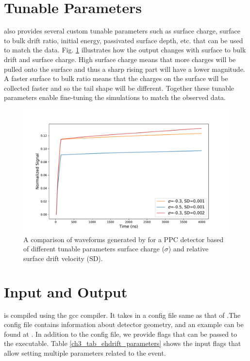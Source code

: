 \section{Tunable Parameters}
{\ehd} also provides several custom tunable parameters such as surface charge, surface to bulk drift ratio, initial energy, passivated surface depth, etc. that can be used to match the data. Fig. \ref{fig:wf_comp} illustrates how the output changes with surface to bulk drift and surface charge. High surface charge means that more charges will be pulled onto the surface and thus a sharp rising part will have a lower magnitude. A faster surface to bulk ratio means that the charges on the surface will be collected faster and so the tail shape will be different. Together these tunable parameters enable fine-tuning the simulations to match the observed data.

\begin{figure}%
    \includegraphics[trim={0.1cm 0.3cm 1.3cm 0.3cm},clip,width=0.99\linewidth]{ch3/figs/wf_comp.pdf}
    \caption{A comparison of waveforms generated by {\ehd} for a {\Ltwo} PPC detector based of different tunable parameters surface charge ($\sigma$) and relative surface drift velocity (SD).}
    \label{fig:wf_comp}
\end{figure}


\section{Input and Output}
{\ehd} is compiled using the gcc compiler. It takes in a config file same as that of {\siggen}.The config file contains information about detector geometry, and an example can be found at \cite{ehdrift2024}. In addition to the config file, we provide flags that can be passed to the executable. Table \ref{ch3_tab_ehdrift_parameters} shows the input flags that allow setting multiple parameters related to the event.



